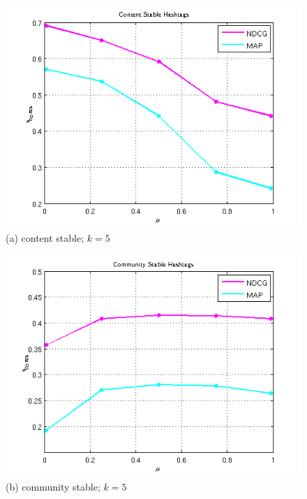 \begin{figure}[!t]
\begin{minipage}{0.310\linewidth}
  \centering
  \includegraphics[width=1\textwidth]{KDD/images/content}             
   (a) content stable; $k = 5$ 
\end{minipage}
\begin{minipage}{0.310\linewidth}
  \centering
  \includegraphics[width=1\textwidth]{KDD/images/community}             
  (b) community stable; $k = 5$
\end{minipage}
\begin{minipage}{0.310\linewidth}
  \centering

\end{minipage}
\end{figure}
